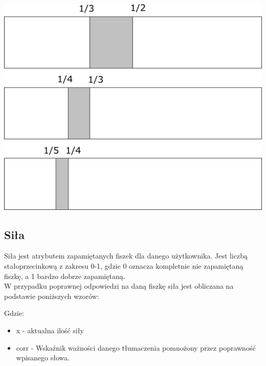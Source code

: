 \begin{center}
	\centering
	\includegraphics[width=\textwidth]{images/interval.png}
\end{center}


\newpage
\subsection{Siła}

Siła jest atrybutem zapamiętanych fiszek dla danego użytkownika. Jest liczbą stałoprzecinkową z zakresu 0-1, gdzie 0 oznacza kompletnie nie zapamiętaną fiszkę, a 1 bardzo dobrze zapamiętaną.  \\
W przypadku poprawnej odpowiedzi na daną fiszkę siła jest obliczana na podstawie poniższych wzorów:  \\


Gdzie:
\begin{itemize}
	\item x - aktualna ilość siły
	\item corr - Wskaźnik ważności danego tłumaczenia pomnożony przez poprawność wpisanego słowa.
\end{itemize}

